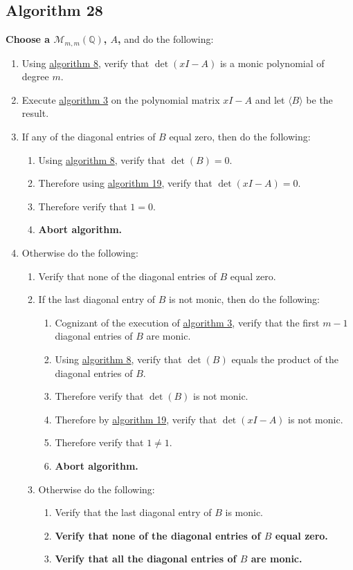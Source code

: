 \documentclass[twocolumn]{article}
\begin{document}
		\subsection{Algorithm 28}\label{sec:algorithm 28}
			\textbf{Choose a $\mathcal{M}_{m,m}(\mathbb{Q})$, $A$,} and do the following:
			\begin{enumerate}
				\item Using \hyperref[sec:algorithm 8]{algorithm 8}, verify that $\det(xI-A)$ is a monic polynomial of degree $m$.
				\item Execute \hyperref[sec:algorithm 3]{algorithm 3} on the polynomial matrix $xI-A$ and let $\langle B\rangle$ be the result.
				\item If any of the diagonal entries of $B$ equal zero, then do the following:
				\begin{enumerate}
					\item Using \hyperref[sec:algorithm 8]{algorithm 8}, verify that $\det(B)=0$.
					\item Therefore using \hyperref[sec:algorithm 19]{algorithm 19}, verify that $\det(xI-A)=0$.
					\item Therefore verify that $1=0$.
					\item \textbf{Abort algorithm.}
				\end{enumerate}
				\item Otherwise do the following:
				\begin{enumerate}
					\item Verify that none of the diagonal entries of $B$ equal zero.
					\item If the last diagonal entry of $B$ is not monic, then do the following:
					\begin{enumerate}
						\item Cognizant of the execution of \hyperref[sec:algorithm 3]{algorithm 3}, verify that the first $m-1$ diagonal entries of $B$ are monic.
						\item Using \hyperref[sec:algorithm 8]{algorithm 8}, verify that $\det(B)$ equals the product of the diagonal entries of $B$.
						\item Therefore verify that $\det(B)$ is not monic.
						\item Therefore by \hyperref[sec:algorithm 19]{algorithm 19}, verify that $\det(xI-A)$ is not monic.
						\item Therefore verify that $1\ne 1$.
						\item \textbf{Abort algorithm.}
					\end{enumerate}
					\item Otherwise do the following:
					\begin{enumerate}
						\item Verify that the last diagonal entry of $B$ is monic.
						\item \textbf{Verify that none of the diagonal entries of $B$ equal zero.}
						\item \textbf{Verify that all the diagonal entries of $B$ are monic.}
					\end{enumerate}
				\end{enumerate}
			\end{enumerate}
\end{document}
